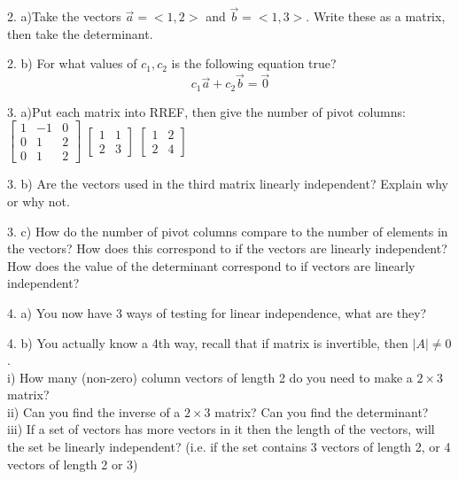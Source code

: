 \documentclass{article}
\begin{document}
\begin{flushleft}
2. a)Take the vectors $\vec{a}=<1,2>$ and $\vec{b}=<1,3>$. Write these as a matrix, then take the determinant.

\vspace{1.5in}

2. b) For what values of $c_1,c_2$ is the following equation true?\\ \begin{equation*} c_1 \vec{a} + c_2 \vec{b} = \vec{0} \end{equation*}

\vspace{1in}

3. a)Put each matrix into RREF, then give the number of pivot columns:\\
$\begin{bmatrix}
1 & -1 & 0\\
0 & 1&2\\
0&1&2
\end{bmatrix}$
\hspace{0.5in}
$\begin{bmatrix}
1 & 1\\
2 & 3
\end{bmatrix}$
\hspace{0.5in}
$\begin{bmatrix}
1 & 2\\
2 & 4
\end{bmatrix}$

\vspace{3in}

3. b) Are the vectors used in the third matrix linearly independent? Explain why or why not.

\vspace{1in}

3. c) How do the number of pivot columns compare to the number of elements in the vectors? How does this correspond to if the vectors are linearly independent? How does the value of the determinant correspond to if vectors are linearly independent?

\vspace{1.5in}

4. a) You now have 3 ways of testing for linear independence, what are they?

\vspace{1in}

4. b) You actually know a 4th way, recall that if matrix is invertible, then $|A|\neq 0$. \\
i) How many (non-zero) column vectors of length 2 do you need to make a $2 \times 3$ matrix?\\
ii) Can you find the inverse of a $2\times 3 $ matrix? Can you find the determinant?\\
iii) If a set of vectors has more vectors in it then the length of the vectors, will the set be linearly independent? (i.e. if the set contains 3 vectors of length 2, or 4 vectors of length 2 or 3)


\end{flushleft}
\end{document}

